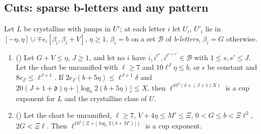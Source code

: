 \subsection{Cuts: sparse b-letters and any pattern}\label{cg-lifting:sec:cuts}

\begin{theorem}\label{cg-lifting:thm:cuts}
Let $L$ be crystalline with jumps in $U'$; at each letter $i$ let $U_i$, $U'_i$
lie in $[-\eta,\eta]\cup\mp\epsilon_i[\beta_i,\beta_i+V]$, $\eta\ge1$, $\beta_i=b$ on a set
$\mathcal B$ of \emph{b-letters}, $\beta_i=G$ otherwise.
\begin{enumerate}[label=(\alph*)]
\item () Let $G+V\le\eta$, $J\ge1$, and let no
  $i$ have $i,i^{\ell^s},i^{\ell^{s+s'}}\in\mathcal B$ with $1\le s,s'\le J$. Let the chart be
  unramified with $\ell\ge7$ and $10\ell^J\eta\le b$, or $\epsilon$ be constant and $8e_\Gamma\le\ell^{J+1}$. If
  $2e_\Gamma(b+5\eta)\le\ell^{J+1}\delta$ and $20(J+1+\mathfrak d)\eta+\lfloor\log_\ell2(b+5\eta)\rfloor\le X$, then
  $\ell^{10^3(\delta+(J+1)X)}$ is a cup exponent for $L$ and the crystalline class of $U$.
\item () Let the chart be unramified,
  $\ell\ge7$, $V+4\eta\le M'\le\Xi$, $0<G\le b<\Xi\ell^2$, $2G<\Xi\ell$. Then
  $\ell^{10^4(\Xi+\lfloor\log_\ell2(b+M')\rfloor)}$ is a cup exponent.
\end{enumerate}
\end{theorem}

